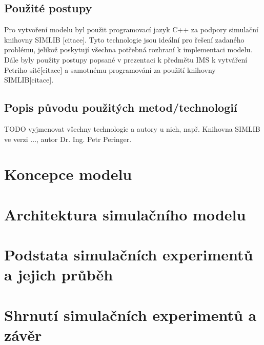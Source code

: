 \documentclass[a4paper, 11pt]{article}
\begin{document}
	\subsection{Použité postupy}

	Pro vytvoření modelu byl použit programovací jazyk C++ za podpory simulační knihovny SIMLIB [citace]. Tyto technologie jsou ideální pro řešení zadaného problému, jelikož poskytují všechna potřebná rozhraní k implementaci modelu. Dále byly použity postupy popsané v prezentaci k předmětu IMS k vytváření Petriho sítě[citace] a samotnému programování za použití knihovny SIMLIB[citace].

	\subsection{Popis původu použitých metod/technologií}

	TODO vyjmenovat všechny technologie a autory u nich, např. Knihovna SIMLIB ve verzi ..., autor Dr. Ing. Petr Peringer.


	\section{Koncepce modelu}



	\section{Architektura simulačního modelu}



	\section{Podstata simulačních experimentů a jejich průběh}




	\section{Shrnutí simulačních experimentů a závěr}
\end{document}

